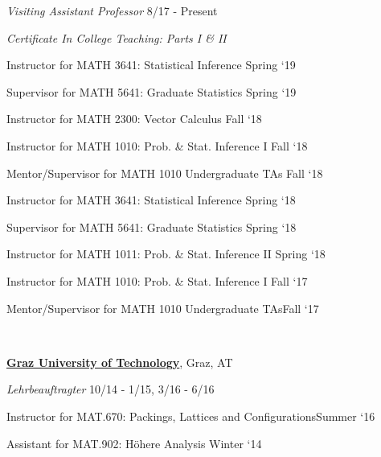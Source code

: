 \documentclass[10pt]{article}
\newlength{\footpageshift}
\newenvironment{outerlist}[1][\enskip\textbullet]%
        {\begin{itemize}[#1]}{\end{itemize}%
         \vspace{-.6\baselineskip}}
\newenvironment{innerlist}[1][\enskip\textbullet]%
        {\begin{compactitem}[#1]}{\end{compactitem}}
\begin{document}
\begin{outerlist}
\item[] \textit{Visiting Assistant Professor}%
\hspace{\footpageshift}\textrm{8/17 - Present}
\vspace{-.5em}
\item[] \textit{Certificate In College Teaching: Parts I \& II}
    \begin{innerlist}[-]
       \item Instructor for MATH 3641: Statistical Inference \hfill Spring `19
              \item Supervisor for MATH 5641: Graduate Statistics \hfill Spring `19
     \item Instructor for MATH 2300: Vector Calculus \hfill Fall `18
     \item Instructor for MATH 1010:  Prob. \& Stat. Inference I \hfill Fall `18
          \item Mentor/Supervisor for MATH 1010 Undergraduate TAs \hfill Fall `18
      \item Instructor for MATH 3641:  Statistical Inference \hfill Spring `18
                    \item Supervisor for MATH 5641: Graduate Statistics \hfill Spring `18
      \item Instructor for MATH 1011:  Prob. \& Stat. Inference II \hfill Spring `18
     \item Instructor for MATH 1010:  Prob. \& Stat. Inference I \hfill Fall `17
     \item Mentor/Supervisor for MATH 1010 Undergraduate TAs\hfill Fall `17
       \end{innerlist}~
\end{outerlist}



%
\href{http://www.tugraz.at}{\textbf{Graz University of Technology}},
Graz, AT
%
\begin{outerlist}
\item[] \textit{Lehrbeauftragter}%
\hspace{\footpageshift}\textrm{10/14 - 1/15, 3/16 - 6/16} %
    \begin{innerlist}[-]
     \item Instructor for MAT.670:  Packings, Lattices and Configurations\hfill Summer `16
     \item Assistant for MAT.902: H\"ohere Analysis   \hfill Winter `14 
    \end{innerlist}~
\end{outerlist}
\end{document}
